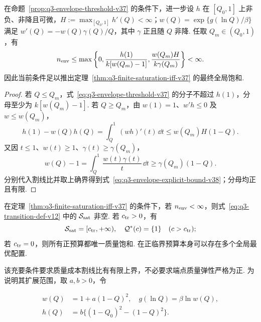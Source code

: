 \begin{proposition}[单调质量响应下的可计算饱和充分界]\label{prop:q3-envelope-explicit-bound-v38}
在命题~\ref{prop:q3-envelope-threshold-v37} 的条件下，进一步设 $h$ 在 $[Q_0,1]$ 上非负、非降且可微，$H:=\max_{[Q_0,1]}h'(Q)<\infty$；$w(Q)=\exp\{g(\ln Q)/\beta\}$ 满足 $w'(Q)=-w(Q)\gamma(Q)/Q$，其中 $\gamma$ 正且随 $Q$ 非降. 任取 $Q_m\in(Q_0,1)$，有
\begin{equation}\label{eq:q3-envelope-explicit-bound-v38}
n_{\rm env}\le
\max\left\{0,\frac{h(1)}{k[w(Q_m)-1]},
\frac{w(Q_m)H}{k\gamma(Q_m)}\right\}<\infty.
\end{equation}
因此当前条件足以推出定理~\ref{thm:q3-finite-saturation-iff-v37} 的最终全局饱和. 
\end{proposition}
\begin{proof}
若 $Q\le Q_m$，式~\eqref{eq:q3-envelope-threshold-v37} 的分子不超过 $h(1)$，分母至少为 $k[w(Q_m)-1]$. 若 $Q\ge Q_m$，由 $w(1)=1$、$w'h\le0$ 及 $w\le w(Q_m)$，
\[
h(1)-w(Q)h(Q)=\int_Q^1(wh)'(t)\,\dd t
\le w(Q_m)H(1-Q).
\]
又因 $t\le1$、$w(t)\ge1$、$\gamma(t)\ge\gamma(Q_m)$，
\[
w(Q)-1=\int_Q^1\frac{w(t)\gamma(t)}{t}\,\dd t
\ge\gamma(Q_m)(1-Q).
\]
分别代入割线比并取上确界得到式~\eqref{eq:q3-envelope-explicit-bound-v38}；分母均正且有限. 
\end{proof}

\begin{corollary}[首次全局饱和的上区间结构]\label{cor:q3-saturation-upper-interval-v37}
在定理~\ref{thm:q3-finite-saturation-iff-v37} 的条件下，若 $n_{\rm env}<\infty$，则式~\eqref{eq:q3-transition-def-v12} 中的 $\mathcal S_{\rm sat}$ 非空. 若 $c_{\rm tr}>0$，有
\[
\mathcal S_{\rm sat}=[c_{\rm tr},+\infty),
\quad\mathcal Q^*(c)=\{1\}\quad(c>c_{\rm tr});
\]
若 $c_{\rm tr}=0$，则所有正预算都唯一质量饱和. 在正临界预算本身可以存在多个全局最优配置. 
\end{corollary}

该充要条件要求质量成本割线比有有限上界，不必要求端点质量弹性严格为正. 为说明其扩展范围，取 $a,b>0$，令

\begin{subequations}\label{eq:q3-zero-elasticity-example-v37}
\begin{align}
w(Q)&=1+a(1-Q)^2,\quad g(\ln Q)=\beta\ln w(Q),\\
h(Q)&=b\{(1-Q_0)^2-(1-Q)^2\}.
\end{align}
\end{subequations}

